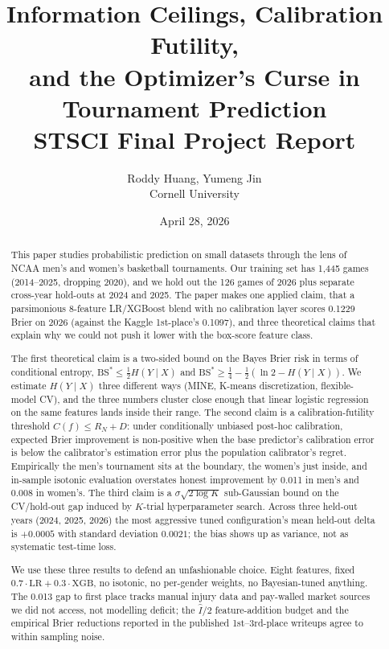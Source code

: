 \documentclass[11pt,a4paper]{article}
\title{%
    \vspace{-1cm}
    {\LARGE\bfseries Information Ceilings, Calibration Futility,\\and the Optimizer's Curse in Tournament Prediction}\\[6pt]
    {\large STSCI Final Project Report}
}
\author{
    Roddy Huang, Yumeng Jin \\
    Cornell University
}
\date{April 28, 2026}
\theoremstyle{definition}
\newcommand{\BS}{\mathrm{BS}}
\begin{document}
\maketitle
\thispagestyle{fancy}

\begin{abstract}
This paper studies probabilistic prediction on small datasets through the lens of NCAA men's and women's basketball tournaments. Our training set has 1{,}445 games (2014--2025, dropping 2020), and we hold out the 126 games of 2026 plus separate cross-year hold-outs at 2024 and 2025. The paper makes one applied claim, that a parsimonious 8-feature LR/XGBoost blend with no calibration layer scores 0.1229 Brier on 2026 (against the Kaggle 1st-place's 0.1097), and three theoretical claims that explain why we could not push it lower with the box-score feature class.

The first theoretical claim is a two-sided bound on the Bayes Brier risk in terms of conditional entropy, $\BS^* \le \tfrac{1}{2} H(Y \mid X)$ and $\BS^* \ge \tfrac{1}{4} - \tfrac{1}{2}(\ln 2 - H(Y \mid X))$. We estimate $H(Y \mid X)$ three different ways (MINE, K-means discretization, flexible-model CV), and the three numbers cluster close enough that linear logistic regression on the same features lands inside their range. The second claim is a calibration-futility threshold $C(f) \le R_N + D$: under conditionally unbiased post-hoc calibration, expected Brier improvement is non-positive when the base predictor's calibration error is below the calibrator's estimation error plus the population calibrator's regret. Empirically the men's tournament sits at the boundary, the women's just inside, and in-sample isotonic evaluation overstates honest improvement by 0.011 in men's and 0.008 in women's. The third claim is a $\sigma \sqrt{2 \log K}$ sub-Gaussian bound on the CV/hold-out gap induced by $K$-trial hyperparameter search. Across three held-out years (2024, 2025, 2026) the most aggressive tuned configuration's mean held-out delta is $+0.0005$ with standard deviation $0.0021$; the bias shows up as variance, not as systematic test-time loss.

We use these three results to defend an unfashionable choice. Eight features, fixed $0.7 \cdot \mathrm{LR} + 0.3 \cdot \mathrm{XGB}$, no isotonic, no per-gender weights, no Bayesian-tuned anything. The 0.013 gap to first place tracks manual injury data and pay-walled market sources we did not access, not modelling deficit; the $\hat I/2$ feature-addition budget and the empirical Brier reductions reported in the published 1st--3rd-place writeups agree to within sampling noise.
\end{abstract}
\end{document}
